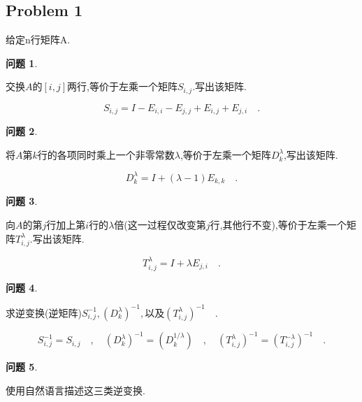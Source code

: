 \documentclass[11pt]{ctexart}
\theoremstyle{definition}
\newtheorem{qqq}{问题}[section]
\numberwithin{equation}{section}
\begin{document}
\subsection{Problem 1}给定n行矩阵A.
\begin{qqq}
    \begin{pinked}
    交换$A$的$[i,j]$两行,等价于左乘一个矩阵$S_{i,j}$.写出该矩阵.
    \end{pinked}
\end{qqq}
\begin{aaa}
    $$S_{i,j}=I-E_{i,i}-E_{j,j}+E_{i,j}+E_{j,i}\quad.$$
\end{aaa}
\begin{qqq}
    \begin{pinked}
        将$A$第$k$行的各项同时乘上一个非零常数$\lambda$,等价于左乘一个矩阵$D^{\lambda}_k$,写出该矩阵.
    \end{pinked}
    
\end{qqq}
\begin{aaa}
    $$D^{\lambda}_k=I+(\lambda-1)E_{k,k}\quad.$$
\end{aaa}
\begin{qqq}
    \begin{pinked}
        向$A$的第$j$行加上第$i$行的$\lambda$倍(这一过程仅改变第$j$行,其他行不变),等价于左乘一个矩阵$T^{\lambda}_{i,j}.$写出该矩阵.
    \end{pinked}
    
\end{qqq}
\begin{aaa}
    $$T^{\lambda}_{i,j}=I+\lambda E_{j,i}\quad .$$
\end{aaa}
\begin{qqq}
    \begin{pinked}
        求逆变换(逆矩阵)$S^{-1}_{i,j},(D^\lambda _{k})^{-1},$以及$(T^\lambda _{i,j})^{-1}\quad.$
    \end{pinked}
   
\end{qqq}
\begin{aaa}
    $$S^{-1}_{i,j}=S_{i,j}\quad , \quad
    (D^\lambda _{k})^{-1}=(D^{1/\lambda} _{k})\quad , \quad
    (T^\lambda _{i,j})^{-1}=(T^{-\lambda} _{i,j})^{-1} \quad .$$
\end{aaa}
\begin{qqq}
    \begin{pinked}
        使用自然语言描述这三类逆变换.
    \end{pinked}
    
\end{qqq}
\end{document}
